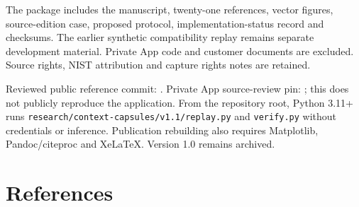 \documentclass[
  11pt,
]{article}
\let\originalsection\section
\renewcommand{\section}{\Needspace{5\baselineskip}\originalsection}
\begin{document}
The package includes the manuscript, twenty-one references, vector
figures, source-edition case, proposed protocol, implementation-status
record and checksums. The earlier synthetic compatibility replay remains
separate development material. Private App code and customer documents
are excluded. Source rights, NIST attribution and capture rights notes
are retained.

Reviewed public reference commit:
\texttt{}. Private
App source-review pin:
\texttt{}; this does
not publicly reproduce the application. From the repository root, Python
3.11+ runs \texttt{research/context-capsules/v1.1/replay.py} and
\texttt{verify.py} without credentials or inference. Publication
rebuilding also requires Matplotlib, Pandoc/citeproc and XeLaTeX.
Version 1.0 remains archived.

\section*{References}\label{references}
\end{document}
